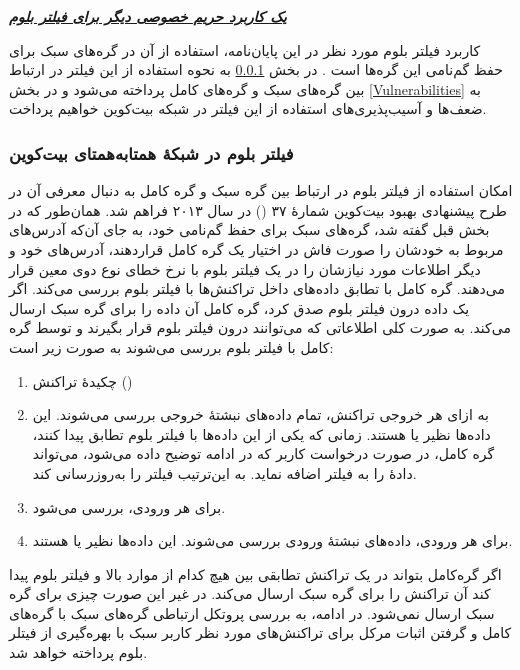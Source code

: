 \textbf{\textit{\underline{یک کاربرد حریم خصوصی دیگر برای فیلتر بلوم}}}

کاربرد فیلتر بلوم مورد نظر در این پایان‌نامه، استفاده از آن در گره‌های سبک برای حفظ گم‌نامی این گره‌ها است \cite{Hearn2013}. در بخش‌  \ref{BloomFilterInP2P} به نحوه استفاده از این فیلتر در ارتباط بین گره‌های سبک و گره‌های کامل پرداخته می‌شود و در بخش \ref{Vulnerabilities} به ضعف‌ها و آسیب‌پذیری‌های استفاده از این فیلتر در شبکه بیت‌کوین خواهیم پرداخت. 


\subsubsection{فیلتر بلوم در شبکهٔ همتا‌به‌همتای بیت‌کوین}
\label{BloomFilterInP2P}

امکان استفاده از فیلتر بلوم در ارتباط بین گره سبک و گره کامل به دنبال معرفی آن در طرح پیشنهادی بهبود بیت‌کوین شمارهٔ ۳۷ () \cite{Hearn2013} در سال ۲۰۱۳ فراهم شد. همان‌طور که در بخش قبل گفته شد، گره‌‌های سبک برای حفظ گم‌نامی خود، به جای آن‌که آدرس‌های مربوط به خودشان را صورت فاش در اختیار یک گره کامل قراردهند، آدرس‌های خود و دیگر اطلاعات مورد نیازشان را در یک فیلتر بلوم با نرخ خطای نوع دوی معین قرار می‌دهند. گره کامل با تطابق داده‌های داخل تراکنش‌ها با فیلتر بلوم بررسی می‌کند. اگر یک داده درون فیلتر بلوم صدق کرد، گره کامل آن داده را برای گره سبک ارسال می‌کند. به صورت کلی اطلاعاتی که می‌توانند درون فیلتر بلوم قرار بگیرند و توسط گره کامل با فیلتر بلوم بررسی می‌شوند به صورت زیر است:
\begin{enumerate}
\item{%
چکیدهٔ تراکنش‌ ()}
\item{%
به ازای هر خروجی تراکنش، تمام داده‌های
نبشتهٔ خروجی بررسی می‌شوند. این داده‌ها نظیر  یا  هستند. زمانی که یکی از این داده‌ها با فیلتر بلوم تطابق پیدا کنند، گره کامل، در صورت درخواست کاربر که در ادامه توضیح داده می‌شود، می‌تواند دادهٔ  را به فیلتر اضافه نماید. به این‌ترتیب فیلتر را به‌روزرسانی کند.
}
\item{%
برای هر ورودی،  بررسی می‌شود.
}
\item{%
برای هر ورودی، داده‌های نبشتهٔ ورودی بررسی می‌شوند. این داده‌ها نظیر 
یا
هستند.
}
\end{enumerate} 

اگر گره‌کامل بتواند در یک تراکنش تطابقی بین هیچ کدام از موارد بالا و فیلتر بلوم پیدا کند آن تراکنش را برای گره سبک ارسال می‌کند. در غیر این صورت چیزی برای گره سبک ارسال نمی‌شود. در ادامه، به بررسی پروتکل ارتباطی گره‌های سبک با گره‌های کامل و گرفتن اثبات مرکل  برای تراکنش‌های مورد نظر کاربر سبک با بهره‌گیری از فیتلر بلوم پرداخته خواهد شد. 

